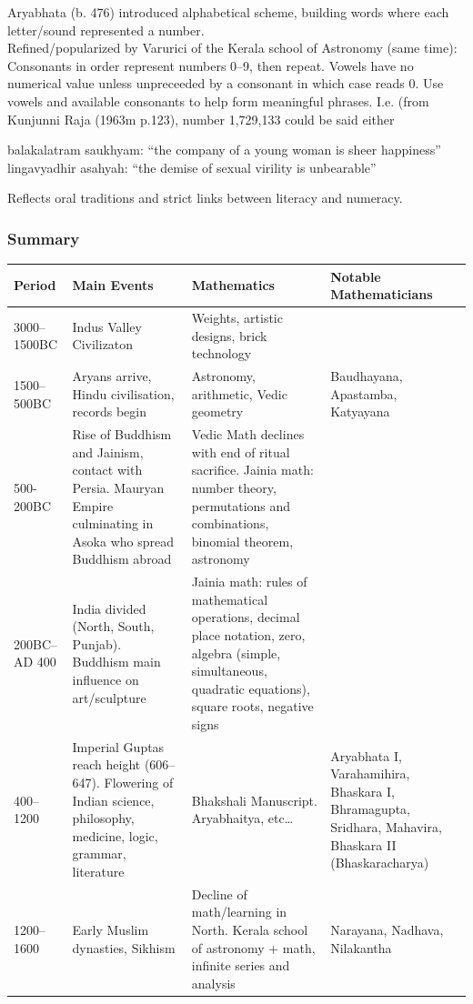 Aryabhata (b. 476) introduced alphabetical scheme, building words where each letter/sound represented a number.\\
Refined/popularized by Varurici of the Kerala school of Astronomy (same time):\\
Consonants in order represent numbers 0--9, then repeat. Vowels have no numerical value unless unpreceeded by a consonant in which case reads 0. Use vowels and available consonants to help form meaningful phrases. I.e. (from Kunjunni Raja (1963m p.123), number 1,729,133 could be said either
\begin{center}
balakalatram saukhyam: ``the company of a young woman is sheer happiness''\\
lingavyadhir asahyah: ``the demise of sexual virility is unbearable''
\end{center}

Reflects oral traditions and strict links between literacy and numeracy.



\subsubsection*{Summary}

\begin{tabular}{l p{120pt} p{150pt} p{85pt}}
Period&Main Events&Mathematics&Notable Mathematicians\\\hline
3000--1500BC&Indus Valley Civilizaton&Weights, artistic designs, brick technology&\\
1500--500BC&Aryans arrive, Hindu civilisation, records begin&Astronomy, arithmetic, Vedic geometry&Baudhayana, Apastamba, Katyayana\\
500-200BC&Rise of Buddhism and Jainism, contact with Persia. Mauryan Empire culminating in Asoka who spread Buddhism abroad&Vedic Math declines with end of ritual sacrifice. Jainia math: number theory, permutations and combinations, binomial theorem, astronomy&\\
200BC--AD 400&India divided (North, South, Punjab). Buddhism main influence on
art/sculpture&Jainia math: rules of mathematical operations, decimal place
notation, zero, algebra (simple, simultaneous, quadratic equations), square
roots, negative signs&\\
400--1200&Imperial Guptas reach height (606--647). Flowering of Indian science, philosophy, medicine, logic, grammar, literature&Bhakshali Manuscript. Aryabhaitya, etc\ldots&Aryabhata I, Varahamihira, Bhaskara I, Bhramagupta, Sridhara, Mahavira, Bhaskara II (Bhaskaracharya)\\
1200--1600&Early Muslim dynasties, Sikhism&Decline of math/learning in North. Kerala school of astronomy + math, infinite series and analysis&Narayana, Nadhava, Nilakantha
\end{tabular}

